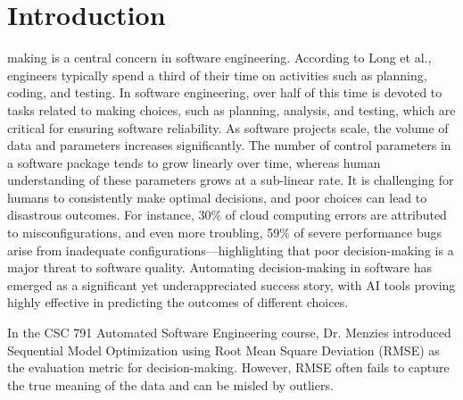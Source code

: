 \documentclass{ieeeaccess}
\begin{document}
\section{Introduction}
\label{sec:introduction}
 making is a central concern in software engineering. According to Long et al.\cite{10352439}, engineers typically spend a third of their time on activities such as planning, coding, and testing. In software engineering, over half of this time is devoted to tasks related to making choices, such as planning, analysis, and testing, which are critical for ensuring software reliability. As software projects scale, the volume of data and parameters increases significantly. The number of control parameters in a software package tends to grow linearly over time, whereas human understanding of these parameters grows at a sub-linear rate\cite{10.1145/2786805.2786852}. It is challenging for humans to consistently make optimal decisions, and poor choices can lead to disastrous outcomes. For instance, 30\% of cloud computing errors are attributed to misconfigurations\cite{yy}, and even more troubling, 59\% of severe performance bugs arise from inadequate configurations—highlighting that poor decision-making is a major threat to software quality\cite{10.1145/2961111.2962602}. Automating decision-making in software has emerged as a significant yet underappreciated success story, with AI tools proving highly effective in predicting the outcomes of different choices\cite{9734271}.

In the CSC 791 Automated Software Engineering course, Dr. Menzies introduced Sequential Model Optimization using Root Mean Square Deviation (RMSE) as the evaluation metric for decision-making. However, RMSE often fails to capture the true meaning of the data and can be misled by outliers.
\end{document}
